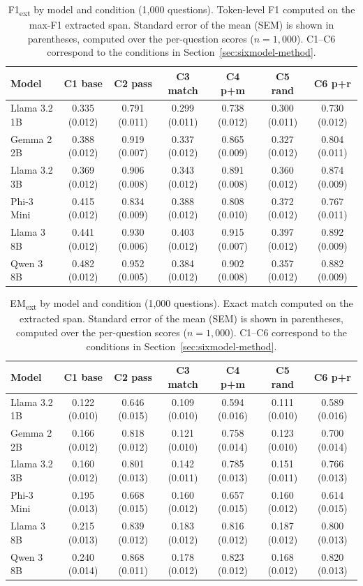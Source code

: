\documentclass[master]{thesis}
\newcommand{\sref}[1]{Section~\ref{#1}}  %
\begin{document}
\begin{table}[h]
\centering
\small
\setlength{\tabcolsep}{3pt}
\begin{tabular}{lcccccc}
\toprule
Model & C1 base & C2 pass & C3 match & C4 p+m & C5 rand & C6 p+r \\
\midrule
Llama 3.2 1B & 0.335 (0.012) & 0.791 (0.011) & 0.299 (0.011) & 0.738 (0.012) & 0.300 (0.011) & 0.730 (0.012) \\
Gemma 2 2B   & 0.388 (0.012) & 0.919 (0.007) & 0.337 (0.012) & 0.865 (0.009) & 0.327 (0.012) & 0.804 (0.011) \\
Llama 3.2 3B & 0.369 (0.012) & 0.906 (0.008) & 0.343 (0.012) & 0.891 (0.008) & 0.360 (0.012) & 0.874 (0.009) \\
Phi-3 Mini   & 0.415 (0.012) & 0.834 (0.009) & 0.388 (0.012) & 0.808 (0.010) & 0.372 (0.012) & 0.767 (0.011) \\
Llama 3 8B   & 0.441 (0.012) & 0.930 (0.006) & 0.403 (0.012) & 0.915 (0.007) & 0.397 (0.012) & 0.892 (0.009) \\
Qwen 3 8B    & 0.482 (0.012) & 0.952 (0.005) & 0.384 (0.012) & 0.902 (0.008) & 0.357 (0.012) & 0.882 (0.009) \\
\bottomrule
\end{tabular}
\caption{F1\textsubscript{ext} by model and condition (1,000 questions). Token-level F1 computed on the max-F1 extracted span. Standard error of the mean (SEM) is shown in parentheses, computed over the per-question scores ($n = 1{,}000$). C1--C6 correspond to the conditions in \sref{sec:sixmodel-method}.}
\label{tab:f1ext}
\end{table}

\begin{table}[h]
\centering
\small
\setlength{\tabcolsep}{3pt}
\begin{tabular}{lcccccc}
\toprule
Model & C1 base & C2 pass & C3 match & C4 p+m & C5 rand & C6 p+r \\
\midrule
Llama 3.2 1B & 0.122 (0.010) & 0.646 (0.015) & 0.109 (0.010) & 0.594 (0.016) & 0.111 (0.010) & 0.589 (0.016) \\
Gemma 2 2B   & 0.166 (0.012) & 0.818 (0.012) & 0.121 (0.010) & 0.758 (0.014) & 0.123 (0.010) & 0.700 (0.014) \\
Llama 3.2 3B & 0.160 (0.012) & 0.801 (0.013) & 0.142 (0.011) & 0.785 (0.013) & 0.151 (0.011) & 0.766 (0.013) \\
Phi-3 Mini   & 0.195 (0.013) & 0.668 (0.015) & 0.160 (0.012) & 0.657 (0.015) & 0.160 (0.012) & 0.614 (0.015) \\
Llama 3 8B   & 0.215 (0.013) & 0.839 (0.012) & 0.183 (0.012) & 0.816 (0.012) & 0.187 (0.012) & 0.800 (0.013) \\
Qwen 3 8B    & 0.240 (0.014) & 0.868 (0.011) & 0.178 (0.012) & 0.823 (0.012) & 0.168 (0.012) & 0.820 (0.013) \\
\bottomrule
\end{tabular}
\caption{EM\textsubscript{ext} by model and condition (1,000 questions). Exact match computed on the extracted span. Standard error of the mean (SEM) is shown in parentheses, computed over the per-question scores ($n = 1{,}000$). C1--C6 correspond to the conditions in \sref{sec:sixmodel-method}.}
\label{tab:emext}
\end{table}
\end{document}
